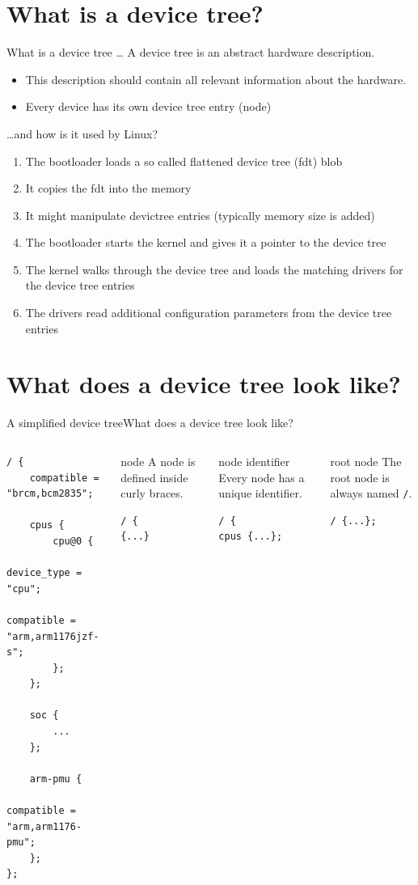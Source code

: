 \documentclass[aspectratio=169]{beamer}
\newcommand{\sectiontitle}{}
\newcommand{\newsection}[1]{\renewcommand{\sectiontitle}{#1}\section{#1}}
\begin{document}
\newsection{What is a device tree?}
\begin{frame}{What is a device tree \ldots}
A device tree is an abstract hardware description.
\begin{itemize}
    \item This description should contain all relevant information about the hardware.
    \item Every device has its own device tree entry (node)
\end{itemize}
\end{frame}

\begin{frame}{\ldots and how is it used by Linux?}
\begin{enumerate}
    \item The bootloader loads a so called flattened device tree (fdt) blob
    \item It copies the fdt into the memory
    \item It might manipulate devictree entries (typically memory size is added)
    \item The bootloader starts the kernel and gives it a pointer to the device tree
    \item The kernel walks through the device tree and loads the matching drivers for the device tree entries
    \item The drivers read additional configuration parameters from the device tree entries
\end{enumerate}
\end{frame}

\newsection{What does a device tree look like?}
\begin{frame}[fragile]{A simplified device tree}{\sectiontitle}
\begin{columns}[T]
\begin{verbatim}
/ {
	compatible = "brcm,bcm2835";

	cpus {
		cpu@0 {
			device_type = "cpu";
			compatible = "arm,arm1176jzf-s";
		};
	};

	soc {
		...
	};

	arm-pmu {
		compatible = "arm,arm1176-pmu";
	};
};
\end{verbatim}
\begin{block}{node}
A node is defined inside curly braces.
\begin{verbatim}
/ {
{...}
\end{verbatim}
\end{block}
\begin{block}{node identifier}
Every node has a unique identifier.
\begin{verbatim}
/ {
cpus {...};
\end{verbatim}
\end{block}
\begin{block}{root node}
The root node is always named \verb|/|.
\begin{verbatim}
/ {...};
\end{verbatim}
\end{block}
\end{columns}
\end{frame}
\end{document}
